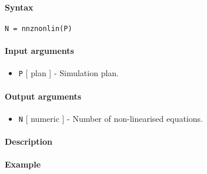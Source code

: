 


	\paragraph{Syntax}

\begin{verbatim}
N = nnznonlin(P)
\end{verbatim}

\paragraph{Input arguments}

\begin{itemize}
\itemsep1pt\parskip0pt
\item
  \texttt{P} {[} plan {]} - Simulation plan.
\end{itemize}

\paragraph{Output arguments}

\begin{itemize}
\itemsep1pt\parskip0pt
\item
  \texttt{N} {[} numeric {]} - Number of non-linearised equations.
\end{itemize}

\paragraph{Description}

\paragraph{Example}


